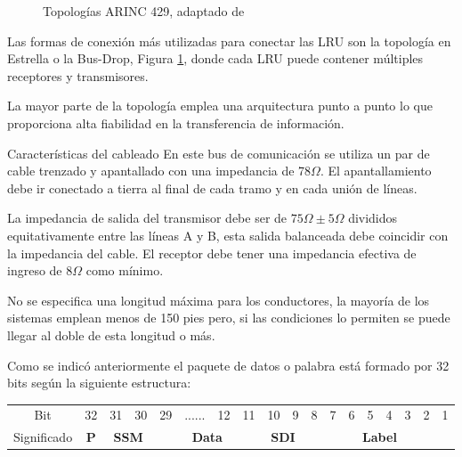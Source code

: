 \begin{figure}[!h]
  \centering

  \caption{Topologías ARINC 429, adaptado de \protect\cite{ARINC429Tutorial2010}}
  \label{fig:01.Topologias.ARINC429}
\end{figure}

Las  formas  de  conexión  más  utilizadas  para  conectar  las  LRU son la topología en Estrella o la Bus-Drop, Figura \ref{fig:01.Topologias.ARINC429}, donde cada LRU puede contener múltiples receptores y transmisores.

La mayor parte de la topología emplea una arquitectura punto a punto lo que proporciona alta fiabilidad en la transferencia de información.

\begin{myboxAzul}{Características del cableado}
  En este bus de
  comunicación se utiliza un par de cable trenzado y apantallado con
  una impedancia de 78$\Omega$.  El apantallamiento debe ir conectado
  a tierra al final de cada tramo y en cada unión de líneas.

La impedancia de salida del transmisor debe ser de $75 \Omega \pm 5 \Omega$
divididos equitativamente entre las líneas A y B, esta salida balanceada debe coincidir con la impedancia del cable. El receptor debe tener una impedancia efectiva de ingreso de $8\Omega$ como mínimo.

No se especifica una longitud máxima para los conductores, la mayoría de los sistemas emplean menos de 150 pies pero, si las condiciones lo permiten se puede llegar al doble de esta longitud o más.

\end{myboxAzul}

Como se indicó anteriormente el paquete de datos o palabra está formado por 
32 bits según la siguiente estructura:

\begin{center}
  \begin{tabular}[c]{c|c|c|c|c|c|c|c|c|c|c|c|c|c|c|c|c|c|} \cline{2-18}
    Bit & 32 & 31 & 30 & 29 & ......& 12 & 11 & 10 & 9 & 8 & 7 & 6 & 5 & 4 & 3 & 2 & 1 \\ \cline{2-18}
  Significado & {\bf P}
  & \multicolumn{2}{c|}{\bf SSM}
  & \multicolumn{4}{c|}{\bf Data} 
  & \multicolumn{2}{c|}{\bf SDI} 
  & \multicolumn{8}{c|}{\bf Label} 
\\ \cline{2-18}
  \end{tabular}
\end{center}




